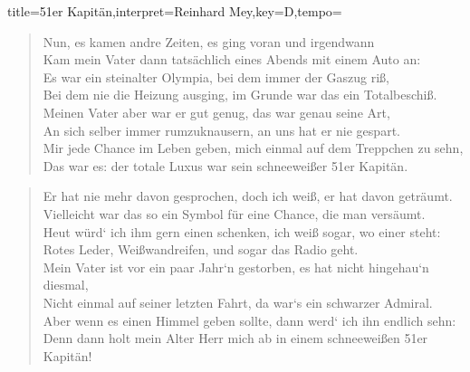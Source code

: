 \documentclass{leadsheet-modern}
\begin{document}
\begin{song}[transpose=5]{title={51er Kapitän},interpret={Reinhard Mey},key={D},tempo={}}
\begin{verse}
Nun, es kamen andre Zeiten, es ging voran und irgendwann \\
Kam mein Vater dann tatsächlich eines Abends mit einem Auto an: \\
Es war ein steinalter Olympia, bei dem immer der Gaszug riß, \\
Bei dem nie die Heizung ausging, im Grunde war das ein Totalbeschiß. \\
Meinen Vater aber war er gut genug, das war genau seine Art, \\
An sich selber immer rumzuknausern, an uns hat er nie gespart. \\
Mir jede Chance im Leben geben, mich einmal auf dem Treppchen zu sehn, \\
Das war es: der totale Luxus war sein schneeweißer 51er Kapitän. \\
\end{verse}

\begin{verse}
Er hat nie mehr davon gesprochen, doch ich weiß, er hat davon geträumt. \\
Vielleicht war das so ein Symbol für eine Chance, die man versäumt. \\
Heut würd‘ ich ihm gern einen schenken, ich weiß sogar, wo einer steht: \\
Rotes Leder, Weißwandreifen, und sogar das Radio geht. \\
Mein Vater ist vor ein paar Jahr‘n gestorben, es hat nicht hingehau‘n diesmal, \\
Nicht einmal auf seiner letzten Fahrt, da war‘s ein schwarzer Admiral. \\
Aber wenn es einen Himmel geben sollte, dann werd‘ ich ihn endlich sehn: \\
Denn dann holt mein Alter Herr mich ab in einem schneeweißen 51er Kapitän! \\
\end{verse}

\end{song}
\end{document}
